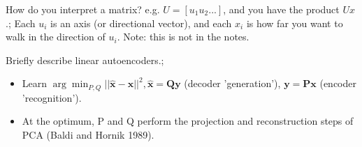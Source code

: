 \documentclass{article}
\begin{document}
How do you interpret a matrix? e.g. $U = [u_1 u_2 ...]$, and you have the product $Ux$.; Each $u_i$ is an axis (or directional vector), and each $x_i$ is how far you want to walk in the direction of $u_i$. \newline Note: this is not in the notes.

Briefly describe linear autoencoders.; \begin{itemize}
	\item Learn $\arg\min_{P,Q}||\hat{\mathbf{x}}-\mathbf{x}||^2, \mathbf{\hat{x}=Qy}$ (decoder 'generation'), $\mathbf{y=Px}$ (encoder 'recognition').
	\item At the optimum, P and Q perform the projection and reconstruction steps of PCA (Baldi and Hornik 1989).
\end{itemize}
\end{document}
